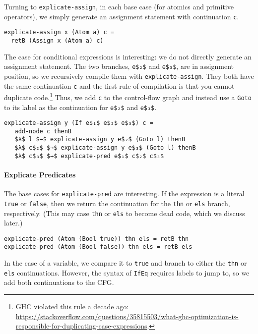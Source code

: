 \documentclass[sigplan,review,dvipsnames,screen,10pt]{acmart}
\begin{document}
Turning to \lstinline{explicate-assign}, in each base case (for
atomics and primitive operators), we simply generate an assignment
statement with continuation \lstinline{c}.

\begin{lstlisting}
explicate-assign x (Atom a) c =
  retB (Assign x (Atom a) c)
\end{lstlisting}

The case for conditional expressions is interesting: we do not
directly generate an assignment statement. The two branches,
\lstinline{e$₂$} and \lstinline{e$₃$}, are in assignment position,
so we recursively compile them with \lstinline{explicate-assign}.
They both have the same continuation \lstinline{c} and the first rule
of compilation is that you cannot duplicate code.\footnote{GHC
violated this rule a decade ago:
\url{https://stackoverflow.com/questions/35815503/what-ghc-optimization-is-responsible-for-duplicating-case-expressions}.}
Thus, we add \lstinline{c} to the control-flow graph and
instead use a \lstinline{Goto} to its label as the continuation
for \lstinline{e$₂$} and \lstinline{e$₃$}.

\begin{lstlisting}
explicate-assign y (If e$₁$ e$₂$ e$₃$) c =
   add-node c thenB
   $λ$ l $→$ explicate-assign y e$₂$ (Goto l) thenB
   $λ$ c$₂$ $→$ explicate-assign y e$₃$ (Goto l) thenB
   $λ$ c$₃$ $→$ explicate-pred e$₁$ c$₂$ c$₃$
\end{lstlisting}

\paragraph{Explicate Predicates}

The base cases for \lstinline{explicate-pred} are interesting.  If the
expression is a literal \lstinline{true} or \lstinline{false}, then we
return the continuation for the \lstinline{thn} or \lstinline{els}
branch, respectively. (This may case \lstinline{thn} or
\lstinline{els} to become dead code, which we discuss later.)

\begin{lstlisting}
explicate-pred (Atom (Bool true)) thn els = retB thn
explicate-pred (Atom (Bool false)) thn els = retB els
\end{lstlisting}

\noindent In the case of a variable, we compare it to \lstinline{true}
and branch to either the \lstinline{thn} or \lstinline{els}
continuations. However, the syntax of \lstinline{IfEq} requires labels
to jump to, so we add both continuations to the CFG.
\end{document}
